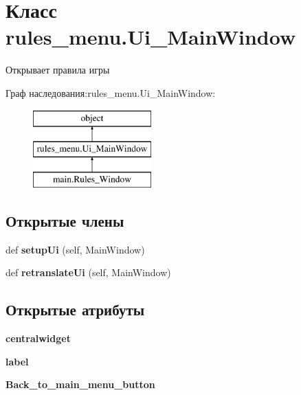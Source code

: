 \hypertarget{classrules__menu_1_1_ui___main_window}{}\section{Класс rules\+\_\+menu.\+Ui\+\_\+\+Main\+Window}
\label{classrules__menu_1_1_ui___main_window}


Открывает правила игры  


Граф наследования\+:rules\+\_\+menu.\+Ui\+\_\+\+Main\+Window\+:\begin{figure}[H]
\begin{center}
\leavevmode
\includegraphics[height=3.000000cm]{classrules__menu_1_1_ui___main_window}
\end{center}
\end{figure}
\subsection*{Открытые члены}
\begin{DoxyCompactItemize}
\item 
\mbox{\label{classrules__menu_1_1_ui___main_window_a820707d0f168e1730de493150a686ce1}} 
def {\bfseries setup\+Ui} (self, Main\+Window)
\item 
\mbox{\label{classrules__menu_1_1_ui___main_window_ab0f9c3d555af3aa8b18933294e1385ac}} 
def {\bfseries retranslate\+Ui} (self, Main\+Window)
\end{DoxyCompactItemize}
\subsection*{Открытые атрибуты}
\begin{DoxyCompactItemize}
\item 
\mbox{\label{classrules__menu_1_1_ui___main_window_a68f503a03e2be66620fa0c6022fd3ce7}} 
{\bfseries centralwidget}
\item 
\mbox{\label{classrules__menu_1_1_ui___main_window_a77c2a92e95229ad7944cea51eba99b12}} 
{\bfseries label}
\item 
\mbox{\label{classrules__menu_1_1_ui___main_window_a6c44d505a286f5bf7370bdaab5bca356}} 
{\bfseries Back\+\_\+to\+\_\+main\+\_\+menu\+\_\+button}
\end{DoxyCompactItemize}


